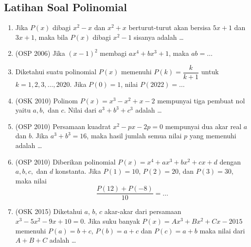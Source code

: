 \subsection{Latihan Soal Polinomial}
\begin{enumerate}

\item Jika $P(x)$ dibagi $x^2-x$ dan $x^2+x$ berturut-turut akan bersisa $5x+1$ dan $3x+1$, maka bila $P(x)$ dibagi $x^2-1$ sisanya adalah \dots

\item (OSP 2006) Jika $(x-1)^2$ membagi $ax^4+bx^3+1$, maka $ab=\dots$

\item Diketahui suatu polinomial $P(x)$ memenuhi $P(k)=\dfrac{k}{k+1}$ untuk $k=1,2,3,\dots,2020$. Jika $P(0)=1$, nilai $P(2022)=\dots$

\item (OSK 2010) Polinom $P(x)=x^3-x^2+x-2$ mempunyai tiga pembuat nol yaitu $a,b,$ dan $c$. Nilai dari $a^3+b^3+c^3$ adalah \dots

\item (OSP 2010) Persamaan kuadrat $x^2-px-2p=0$ mempunyai dua akar real $a$ dan $b$. Jika $a^3+b^3=16$, maka hasil jumlah semua nilai $p$ yang memenuhi adalah \dots 

\item (OSP 2010) Diberikan polinomial $P(x)=x^4+ax^3+bx^2+cx+d$ dengan $a,b,c,$ dan $d$ konstanta. Jika $P(1)=10$, $P(2)=20$, dan  $P(3)=30$, maka nilai
$$\dfrac{P(12)+P(-8)}{10}=\dots$$

\item (OSK 2015) Diketahui $a$, $b$, $c$ akar-akar dari persamaan $x^3 - 5x^2 - 9x + 10 = 0$. Jika suku banyak $P(x) = Ax^3 + Bx^2 + Cx - 2015$ memenuhi $P(a) = b + c$, $P(b) = a + c$ dan $P(c) = a + b$ maka nilai dari $A + B + C$ adalah \ldots

\end{enumerate}